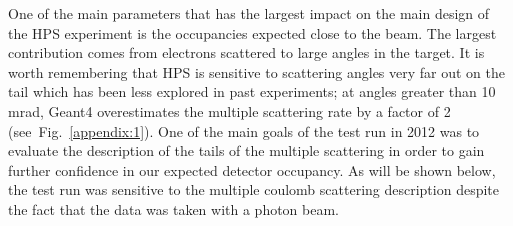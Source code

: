 
One of the main parameters that has the 
largest impact on the main design of the HPS experiment is the occupancies expected 
close to the beam.  The largest contribution comes from electrons scattered to large angles 
in the target. It is worth remembering that HPS is sensitive to scattering angles very far out 
on the tail which has been less explored in past experiments; at angles greater than 10 mrad, 
Geant4 overestimates the multiple scattering rate by a factor of 2 (see~Fig.~\ref{appendix:1}). One of the main goals of the 
test run in 2012 was to evaluate the description of the tails of the multiple scattering in order 
to gain further confidence in our expected detector occupancy. As will be shown below, the 
test run was sensitive to the multiple coulomb scattering description despite the fact that 
the data was taken with a photon beam.


